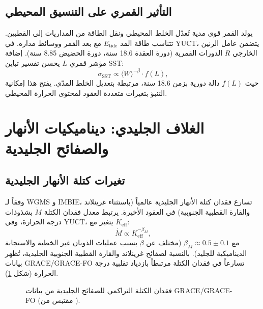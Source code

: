 \documentclass[11pt,a4paper]{article}
\newcommand{\Keff}{K_{\mathrm{eff}}}
\newcommand{\be}{\beta}
\begin{document}
	\subsection{التأثير القمري على التنسيق المحيطي}
	
	يولد القمر قوى مدية تُعدّل الخلط المحيطي ونقل الطاقة من المداريات إلى القطبين. تتناسب طاقة المد \(E_{\text{tide}}\) مع بعد القمر ووسائط مداره. في YUCT، يتضمن عامل الرنين الخارجي \(R\) الدورات القمرية (دورة العقدة 18.6 سنة، دورة الحضيض 8.85 سنة). إضافة مؤشر قمري \(L\) يحسن تفسير تباين SST:
	\[
	\sigma_{\text{SST}} \propto \langle W \rangle^{-\be} \cdot f(L),
	\]
	حيث \(f(L)\) دالة دورية بزمن 18.6 سنة، مرتبطة بتعديل الخلط المدّي. يفتح هذا إمكانية التنبؤ بتغيرات متعددة العقود لمحتوى الحرارة المحيطي.
	
	\section{الغلاف الجليدي: ديناميكيات الأنهار والصفائح الجليدية}
	
	\subsection{تغيرات كتلة الأنهار الجليدية}
	
	وفقاً لـ WGMS و IMBIE، تسارع فقدان كتلة الأنهار الجليدية عالمياً (باستثناء غرينلاند والقارة القطبية الجنوبية) في العقود الأخيرة. يرتبط معدل فقدان الكتلة \(\dot{M}\) بشذوذات درجة الحرارة، وفي YUCT، يتغير مع \(\Keff\):
	\[
	\dot{M} \propto \Keff^{-\beta_M},
	\]
	مع \(\beta_M \approx 0.5 \pm 0.1\) (مختلف عن \(\be\) بسبب عمليات الذوبان غير الخطية والاستجابة الديناميكية للجليد). بالنسبة لصفائح غرينلاند والقارة القطبية الجنوبية الجليدية، تُظهر بيانات GRACE/GRACE-FO تسارعاً في فقدان الكتلة مرتبطاً بازدياد تقلبية درجة الحرارة (شكل \ref{fig:grace}).
	
	\begin{figure}[htbp]
		\centering
		\caption{فقدان الكتلة التراكمي للصفائح الجليدية من بيانات GRACE/GRACE-FO (مقتبس من \cite{IMBIE}).}
		\label{fig:grace}
	\end{figure}
	
\end{document}
